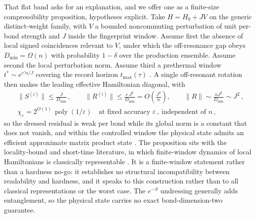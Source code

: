 That flat band asks for an explanation, and we offer one as a finite-size compressibility proposition, hypotheses explicit. Take $H = H_{0} + JV$ on the generic distinct-weight family, with $V$ a bounded noncommuting perturbation of unit per-bond strength and $J$ inside the fingerprint window. Assume first the absence of local signed coincidences relevant to $V$, under which the off-resonance gap obeys $D_{\min} = \Omega(n)$ with probability $1 - \delta$ over the production ensemble. Assume second the local perturbation norm. Assume third a prethermal window $t^{*} \sim e^{c' n / J}$ covering the record horizon $t_{\max}(\tau)$ \cite{abanin2017prethermal}. A single off-resonant rotation then makes the leading effective Hamiltonian diagonal, with
\begin{equation}\label{thm:readability-hardness-nogo}
\begin{aligned}
&\lVert S^{(i)}\rVert \le \frac{J}{D_{\min}}\,, \qquad
\lVert R^{(i)}\rVert \le \frac{c\,J^{2}}{D_{\min}} = O\!\left(\frac{J^{2}}{n}\right), \qquad
\lVert R\rVert \sim \frac{n J^{2}}{D_{\min}} \sim J^{2}\,,\\
&\chi_{\varepsilon} = 2^{O(1)}\,\operatorname{poly}(1/\varepsilon) \quad \text{at fixed accuracy } \varepsilon\,, \ \text{independent of } n\,,
\end{aligned}
\end{equation}
so the dressed residual is weak per bond while its global norm is a constant that does not vanish, and within the controlled window the physical state admits an efficient approximate matrix product state \cite{verstraete2008mps}. The proposition sits with the locality-bound and short-time literature, in which finite-window dynamics of local Hamiltonians is classically representable \cite{lieb1972finite, wild2023shorttime}. It is a finite-window statement rather than a hardness no-go: it establishes no structural incompatibility between readability and hardness, and it speaks to this construction rather than to all classical representations or the worst case. The $e^{-S}$ undressing generally adds entanglement, so the physical state carries no exact bond-dimension-two guarantee.

